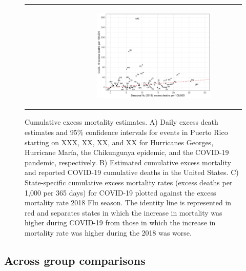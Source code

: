 \documentclass[11pt]{article}
\begin{document}
\begin{figure}[ht]
\begin{tabular}{lll}
\begin{subfigure}[t]{0.3\linewidth}
	\end{subfigure}&
	\begin{subfigure}[t]{0.3\linewidth}
		\centering
		\includegraphics[width=1\linewidth]{figs/figure-2c.pdf}
	\end{subfigure}\\
	\end{tabular}
    \caption{Cumulative excess mortality estimates. A) Daily excess death estimates and 95\% confidence intervals for events in Puerto Rico starting on XXX, XX, XX, and XX for Hurricanes Georges, Hurricane María, the Chikungunya epidemic, and the COVID-19 pandemic, respectively.  B) Estimated cumulative excess mortality and reported COVID-19 cumulative deaths in the United States. C) State-specific cumulative excess mortality rates (excess deaths per 1,000 per 365 days) for COVID-19 plotted against the excess mortality rate 2018 Flu season. The identity line is represented in red and separates states in which the increase in mortality was higher during COVID-19 from those in which the increase in mortality rate was higher during the 2018 was worse.}
    \label{fig:excess-deaths}
\end{figure}

\subsection{Across group comparisons}
\label{subsec:group-comparison}
\end{document}
